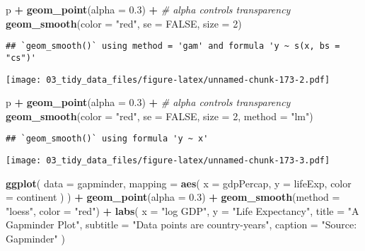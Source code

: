 \documentclass[
]{book}
\newenvironment{Shaded}{\begin{snugshade}}{\end{snugshade}}
\newcommand{\CommentTok}[1]{\textcolor[rgb]{0.56,0.35,0.01}{\textit{#1}}}
\newcommand{\DataTypeTok}[1]{\textcolor[rgb]{0.13,0.29,0.53}{#1}}
\newcommand{\DecValTok}[1]{\textcolor[rgb]{0.00,0.00,0.81}{#1}}
\newcommand{\FloatTok}[1]{\textcolor[rgb]{0.00,0.00,0.81}{#1}}
\newcommand{\KeywordTok}[1]{\textcolor[rgb]{0.13,0.29,0.53}{\textbf{#1}}}
\newcommand{\NormalTok}[1]{#1}
\newcommand{\OperatorTok}[1]{\textcolor[rgb]{0.81,0.36,0.00}{\textbf{#1}}}
\newcommand{\OtherTok}[1]{\textcolor[rgb]{0.56,0.35,0.01}{#1}}
\newcommand{\StringTok}[1]{\textcolor[rgb]{0.31,0.60,0.02}{#1}}
\begin{document}
\begin{Shaded}
\begin{Highlighting}[]
\NormalTok{p }\OperatorTok{+}\StringTok{ }\KeywordTok{geom\_point}\NormalTok{(}\DataTypeTok{alpha =} \FloatTok{0.3}\NormalTok{) }\OperatorTok{+}\StringTok{ }\CommentTok{\# alpha controls transparency}
\StringTok{  }\KeywordTok{geom\_smooth}\NormalTok{(}\DataTypeTok{color =} \StringTok{"red"}\NormalTok{, }\DataTypeTok{se =} \OtherTok{FALSE}\NormalTok{, }\DataTypeTok{size =} \DecValTok{2}\NormalTok{)}
\end{Highlighting}
\end{Shaded}

\begin{verbatim}
## `geom_smooth()` using method = 'gam' and formula 'y ~ s(x, bs = "cs")'
\end{verbatim}

\texttt{[image: 03\_tidy\_data\_files/figure-latex/unnamed-chunk-173-2.pdf]}

\begin{Shaded}
\begin{Highlighting}[]
\NormalTok{p }\OperatorTok{+}\StringTok{ }\KeywordTok{geom\_point}\NormalTok{(}\DataTypeTok{alpha =} \FloatTok{0.3}\NormalTok{) }\OperatorTok{+}\StringTok{ }\CommentTok{\# alpha controls transparency}
\StringTok{  }\KeywordTok{geom\_smooth}\NormalTok{(}\DataTypeTok{color =} \StringTok{"red"}\NormalTok{, }\DataTypeTok{se =} \OtherTok{FALSE}\NormalTok{, }\DataTypeTok{size =} \DecValTok{2}\NormalTok{, }\DataTypeTok{method =} \StringTok{"lm"}\NormalTok{)}
\end{Highlighting}
\end{Shaded}

\begin{verbatim}
## `geom_smooth()` using formula 'y ~ x'
\end{verbatim}

\texttt{[image: 03\_tidy\_data\_files/figure-latex/unnamed-chunk-173-3.pdf]}

\begin{Shaded}
\begin{Highlighting}[]
\KeywordTok{ggplot}\NormalTok{(}
  \DataTypeTok{data =}\NormalTok{ gapminder,}
  \DataTypeTok{mapping =} \KeywordTok{aes}\NormalTok{(}
    \DataTypeTok{x =}\NormalTok{ gdpPercap, }\DataTypeTok{y =}\NormalTok{ lifeExp,}
    \DataTypeTok{color =}\NormalTok{ continent}
\NormalTok{  )}
\NormalTok{) }\OperatorTok{+}
\StringTok{  }\KeywordTok{geom\_point}\NormalTok{(}\DataTypeTok{alpha =} \FloatTok{0.3}\NormalTok{) }\OperatorTok{+}
\StringTok{  }\KeywordTok{geom\_smooth}\NormalTok{(}\DataTypeTok{method =} \StringTok{"loess"}\NormalTok{, }\DataTypeTok{color =} \StringTok{"red"}\NormalTok{) }\OperatorTok{+}
\StringTok{  }\KeywordTok{labs}\NormalTok{(}
    \DataTypeTok{x =} \StringTok{"log GDP"}\NormalTok{,}
    \DataTypeTok{y =} \StringTok{"Life Expectancy"}\NormalTok{,}
    \DataTypeTok{title =} \StringTok{"A Gapminder Plot"}\NormalTok{,}
    \DataTypeTok{subtitle =} \StringTok{"Data points are country{-}years"}\NormalTok{,}
    \DataTypeTok{caption =} \StringTok{"Source: Gapminder"}
\NormalTok{  )}
\end{Highlighting}
\end{Shaded}
\end{document}
